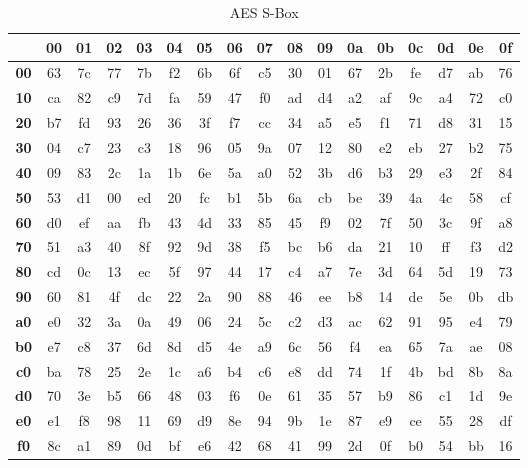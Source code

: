 \begin{table}[h]
    \centering
    \begin{tabular}	{|c|c|c|c|c|c|c|c|c|c|c|c|c|c|c|c|c|}
        \hline
        & \textbf{00} & \textbf{01} & \textbf{02} & \textbf{03} & \textbf{04} & \textbf{05} & \textbf{06} & \textbf{07} & \textbf{08} & \textbf{09} & \textbf{0a} & \textbf{0b} & \textbf{0c} & \textbf{0d} & \textbf{0e} & \textbf{0f} \\
        \hline
        \textbf{00} & 63 & 7c & 77 & 7b & f2 & 6b & 6f & c5 & 30 & 01 & 67 & 2b & fe & d7 & ab & 76 \\
        \hline
        \textbf{10} & ca & 82 & c9 & 7d & fa & 59 & 47 & f0 & ad & d4 & a2 & af & 9c & a4 & 72 & c0 \\
        \hline
        \textbf{20} & b7 & fd & 93 & 26 & 36 & 3f & f7 & cc & 34 & a5 & e5 & f1 & 71 & d8 & 31 & 15 \\
        \hline
        \textbf{30} & 04 & c7 & 23 & c3 & 18 & 96 & 05 & 9a & 07 & 12 & 80 & e2 & eb & 27 & b2 & 75 \\
        \hline
        \textbf{40} & 09 & 83 & 2c & 1a & 1b & 6e & 5a & a0 & 52 & 3b & d6 & b3 & 29 & e3 & 2f & 84 \\
        \hline
        \textbf{50} & 53 & d1 & 00 & ed & 20 & fc & b1 & 5b & 6a & cb & be & 39 & 4a & 4c & 58 & cf \\
        \hline
        \textbf{60} & d0 & ef & aa & fb & 43 & 4d & 33 & 85 & 45 & f9 & 02 & 7f & 50 & 3c & 9f & a8 \\
        \hline
        \textbf{70} & 51 & a3 & 40 & 8f & 92 & 9d & 38 & f5 & bc & b6 & da & 21 & 10 & ff & f3 & d2 \\
        \hline
        \textbf{80} & cd & 0c & 13 & ec & 5f & 97 & 44 & 17 & c4 & a7 & 7e & 3d & 64 & 5d & 19 & 73 \\
        \hline
        \textbf{90} & 60 & 81 & 4f & dc & 22 & 2a & 90 & 88 & 46 & ee & b8 & 14 & de & 5e & 0b & db \\
        \hline
        \textbf{a0} & e0 & 32 & 3a & 0a & 49 & 06 & 24 & 5c & c2 & d3 & ac & 62 & 91 & 95 & e4 & 79 \\
        \hline
        \textbf{b0} & e7 & c8 & 37 & 6d & 8d & d5 & 4e & a9 & 6c & 56 & f4 & ea & 65 & 7a & ae & 08 \\
        \hline
        \textbf{c0} & ba & 78 & 25 & 2e & 1c & a6 & b4 & c6 & e8 & dd & 74 & 1f & 4b & bd & 8b & 8a \\
        \hline
        \textbf{d0} & 70 & 3e & b5 & 66 & 48 & 03 & f6 & 0e & 61 & 35 & 57 & b9 & 86 & c1 & 1d & 9e \\
        \hline
        \textbf{e0} & e1 & f8 & 98 & 11 & 69 & d9 & 8e & 94 & 9b & 1e & 87 & e9 & ce & 55 & 28 & df \\
        \hline
        \textbf{f0} & 8c & a1 & 89 & 0d & bf & e6 & 42 & 68 & 41 & 99 & 2d & 0f & b0 & 54 & bb & 16 \\
        \hline
    \end{tabular}
    \caption{AES S-Box}
    \label{S-Box}
\end{table}

